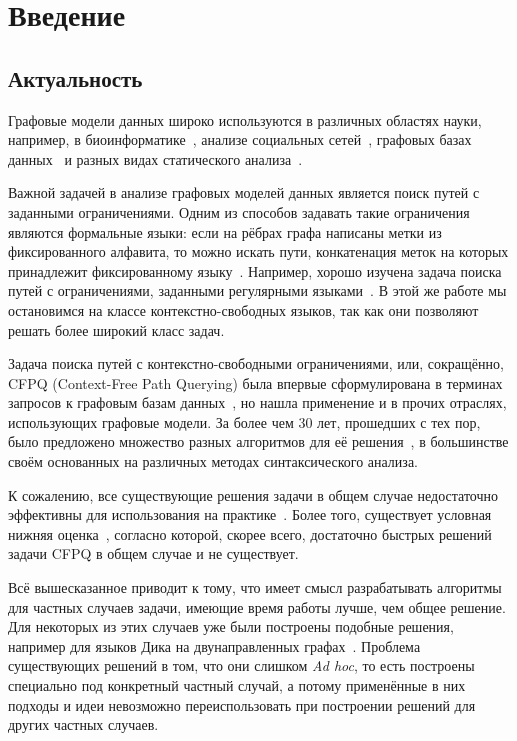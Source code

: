 \section*{Введение}

\subsection*{Актуальность}

Графовые модели данных широко используются в различных областях науки, например, в биоинформатике~\cite{Sevon08}, анализе социальных сетей~\cite{Zarrinkalam14, Chaudhary16}, графовых базах данных~\cite{Medeiros18,Yannakakis1990} и разных видах статического анализа~\cite{Reps1998}. 

Важной задачей в анализе графовых моделей данных является поиск путей с заданными ограничениями. Одним из способов задавать такие ограничения являются формальные языки: если на рёбрах графа написаны метки из фиксированного алфавита, то можно искать пути, конкатенация меток на которых принадлежит фиксированному языку~\cite{Barrett00}. Например, хорошо изучена задача поиска путей с ограничениями, заданными регулярными языками~\cite{Mendelzon1995}. В этой же работе мы остановимся на классе контекстно-свободных языков, так как они позволяют решать более широкий класс задач.

Задача поиска путей с контекстно-свободными ограничениями, или, сокращённо, CFPQ (Context-Free Path Querying) была впервые сформулирована в терминах запросов к графовым базам данных~\cite{Yannakakis1990}, но нашла применение и в прочих отраслях, использующих графовые модели. За более чем 30 лет, прошедших с тех пор, было предложено множество разных алгоритмов для её решения~\cite{Reps97, Hellings15, Santos18}, в большинстве своём основанных на различных методах синтаксического анализа. 

К сожалению, все существующие решения задачи в общем случае недостаточно эффективны для использования на практике~\cite{Kuijpers19}. Более того, существует условная нижняя оценка~\cite{Heintze1997}, согласно которой, скорее всего, достаточно быстрых решений задачи CFPQ в общем случае и не существует.

Всё вышесказанное приводит к тому, что имеет смысл разрабатывать алгоритмы для частных случаев задачи, имеющие время работы лучше, чем общее решение. Для некоторых из этих случаев уже были построены подобные решения, например для языков Дика на двунаправленных графах~\cite{Yuan09,Chatterjee17}. Проблема существующих решений в том, что они слишком \textit{Ad hoc}, то есть построены специально под конкретный частный случай, а потому применённые в них подходы и идеи невозможно переиспользовать при построении решений для других частных случаев.  

